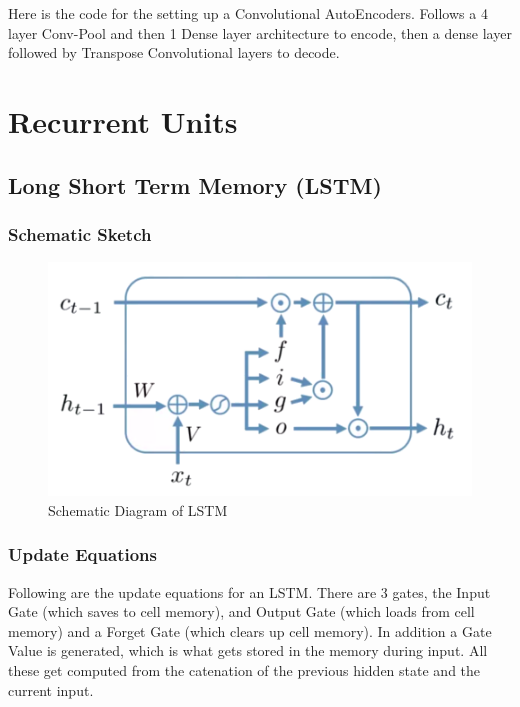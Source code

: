 Here is the code for the setting up a Convolutional AutoEncoders. Follows a 4 layer Conv-Pool and then 1 Dense layer architecture to encode, then a dense layer followed by Transpose Convolutional layers to decode.





\section{Recurrent Units}


\subsection{Long Short Term Memory (LSTM)}

\subsubsection{Schematic Sketch}

\begin{figure}[H]
	\centering
	\includegraphics[width=0.9\linewidth]{img/aml/lstm-schematic.png}
	\caption{Schematic Diagram of LSTM}
	\label{fig:lstm-schmatic}
\end{figure}

\subsubsection{Update Equations}

Following are the update equations for an LSTM. There are 3 gates, the Input Gate (which saves to cell memory), and Output Gate (which loads from cell memory) and a Forget Gate (which clears up cell memory). In addition a Gate Value is generated, which is what gets stored in the memory during input. All these get computed from the catenation of the previous hidden state and the current input.


